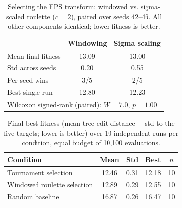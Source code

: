 \begin{table}[t]
\caption{Selecting the FPS transform: windowed vs. sigma-scaled roulette ($c{=}2$), paired over seeds 42--46. All other components identical; lower fitness is better.}
\label{tab:roulette-pick}
\begin{tabular}{lcc}
\toprule
 & Windowing & Sigma scaling \\
\midrule
Mean final fitness & 13.09 & 13.00 \\
Std across seeds & 0.20 & 0.55 \\
Per-seed wins & 3/5 & 2/5 \\
Best single run & 12.80 & 12.23 \\
\midrule
\multicolumn{3}{l}{Wilcoxon signed-rank (paired): $W{=}7.0$, $p{=}1.00$} \\
\bottomrule
\end{tabular}
\end{table}

\begin{table}[t]
\caption{Final best fitness (mean tree-edit distance $+$ std to the five targets; lower is better) over 10 independent runs per condition, equal budget of 10{,}100 evaluations.}
\label{tab:main}
\begin{tabular}{lcccc}
\toprule
Condition & Mean & Std & Best & $n$ \\
\midrule
Tournament selection & 12.46 & 0.31 & 12.18 & 10 \\
Windowed roulette selection & 12.89 & 0.29 & 12.55 & 10 \\
Random baseline & 16.87 & 0.26 & 16.47 & 10 \\
\bottomrule
\end{tabular}
\end{table}
